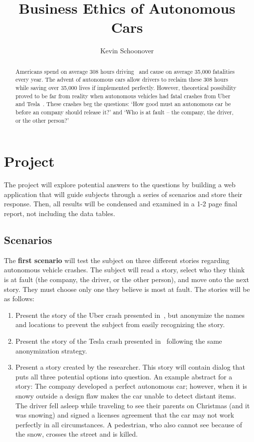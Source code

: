\documentclass{article}
\begin{document}
\title{Business Ethics of Autonomous Cars}
\author{Kevin Schoonover}

\maketitle

\begin{abstract}
Americans spend on average 308 hours driving~\cite{aaa} and cause on average
35,000 fatalities~\cite{nhtsa_fatalities} every year. The advent of autonomous
cars allow drivers to reclaim these 308 hours while saving over 35,000 lives
if implemented perfectly. However, theoretical possibility proved to be far
from reality when autonomous vehicles had fatal crashes from
Uber~\cite{uber} and Tesla~\cite{tesla}. These crashes beg the questions: `How
good must an autonomous car be before an company should release it?' and `Who
is at fault -- the company, the driver, or the other person?'
\end{abstract}

\section{Project}
The project will explore potential answers to the questions by building a web
application that will guide subjects through a series of scenarios and store
their response. Then, all results will be condensed and examined in a 1-2 page
final report, not including the data tables.

\subsection{Scenarios}
The \textbf{first scenario} will test the subject on three different stories
regarding autonomous vehicle crashes. The subject will read a story, select who
they think is at fault (the company, the driver, or the other person), and move
onto the next story. They must choose only one they believe is most at fault.
The stories will be as follows:
\begin{enumerate}
  \item Present the story of the Uber crash presented in~\cite{uber}, but
    anonymize the names and locations to prevent the subject from easily
    recognizing the story.
  \item Present the story of the Tesla crash presented in~\cite{tesla} following
    the same anonymization strategy.
  \item Present a story created by the researcher. This story will contain
    dialog that puts all three potential options into question. An example
    abstract for a story: The company developed a perfect autonomous car;
    however, when it is snowy outside a design flaw makes the car unable to
    detect distant items. The driver fell asleep while traveling to see their
    parents on Christmas (and it was snowing) and signed a licenses agreement
    that the car may not work perfectly in all circumstances. A pedestrian, who
    also cannot see because of the snow, crosses the street and is killed.
\end{enumerate}
\end{document}
